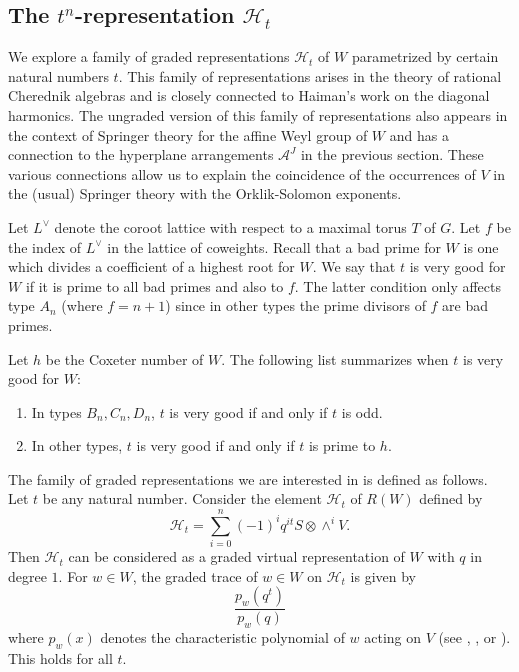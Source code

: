 \documentclass[10pt]{amsart}
\renewcommand{\H}{{\mathcal{H}_t}}
\theoremstyle{plain}
\theoremstyle{definition}
\theoremstyle{remark}
\begin{document}
\subsection{\texorpdfstring{The $t^n$-representation $\H$}{The tn-representation}} 

We explore a family of graded representations $\H$ of $W$ parametrized by certain natural numbers $t$.
This family of representations
arises in the theory of rational Cherednik algebras and is closely connected to Haiman's work on the diagonal harmonics.
The ungraded version of this 
family of representations also appears in the context of Springer theory for the affine Weyl group of $W$ and has a connection to the hyperplane arrangements $\mathcal{A}^J$ in the previous section.
These various connections allow us to explain the coincidence of the occurrences of $V$ in the (usual) Springer theory with the Orklik-Solomon exponents.

Let $L^{\vee}$ denote the coroot lattice with respect to a maximal torus $T$ of $G$.
Let $f$ be the index of $L^{\vee}$ in the lattice of coweights. 
Recall that a bad prime for $W$ is one which divides a coefficient of a highest root for $W$. 
We say that $t$ is very good for $W$ if it is prime to all bad primes and also to $f$.   The latter condition only affects type $A_n$ (where $f=n+1$) since in other types the prime divisors of $f$ are bad primes.

Let $h$ be the Coxeter number of $W$.   
The following list summarizes when $t$ is very good for $W$:
\begin{enumerate}
\item In types $B_n, C_n, D_n$, $t$ is very good if and only if $t$ is odd.
\item In other types, $t$ is very good if and only if $t$ is prime to $h$.
\end{enumerate}

The family of graded representations we are interested in is defined as follows.
Let $t$ be any natural number.
Consider the element $\H$ of $R(W)$ defined by
$$\H = \sum_{i=0}^n (-1)^i q^{it}S \otimes \wedge^i V.$$
Then $\H$ can be considered as a graded virtual representation of $W$ with $q$ in degree $1$.
For $w \in W$, the graded trace of $w \in W$ on $\H$ is given by 
\begin{equation}  \label{graded_trace}
\frac{p_w(q^t)}{ p_w(q)}
\end{equation}
where $p_w(x)$ denotes the characteristic polynomial of $w$ acting on $V$
(see  \cite{solomon}, \cite{gordon:diagonal}, or \cite{beg}).   This holds for all $t$.  
\end{document}
